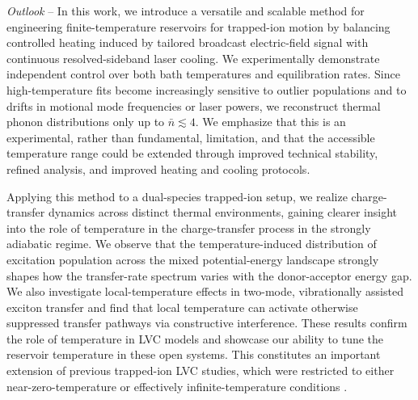 \documentclass[%
reprint,
superscriptaddress,
amsmath,amssymb,
aps,
prl,
floatfix,
]{revtex4-2}
\begin{document}

\emph{Outlook} -- In this work, we introduce a versatile and scalable method for engineering finite-temperature reservoirs for trapped-ion motion by balancing controlled heating induced by tailored broadcast electric-field signal with continuous resolved-sideband laser cooling. We experimentally demonstrate independent control over both bath temperatures and equilibration rates. Since high-temperature fits become increasingly sensitive to outlier populations and to drifts in motional mode frequencies or laser powers, we reconstruct thermal phonon distributions only up to $\bar{n}\lesssim 4$. We emphasize that this is an experimental, rather than fundamental, limitation, and that the accessible temperature range could be extended through improved technical stability, refined analysis, and improved heating and cooling protocols.

Applying this method to a dual-species trapped-ion setup, we realize charge-transfer dynamics across distinct thermal environments, gaining clearer insight into the role of temperature in the charge-transfer process in the strongly adiabatic regime. We observe that the temperature-induced distribution of excitation population across the mixed potential-energy landscape strongly shapes how the transfer-rate spectrum varies with the donor-acceptor energy gap. We also investigate local-temperature effects in two-mode, vibrationally assisted exciton transfer and find that local temperature can activate otherwise suppressed transfer pathways via constructive interference. These results confirm the role of temperature in LVC models and showcase our ability to tune the reservoir temperature in these open systems. This constitutes an important extension of previous trapped-ion LVC studies, which were restricted to either near-zero-temperature \cite{so2024electrontransfer,so2025multimode} or effectively infinite-temperature conditions \cite{sun2025quantum,navickas2025chemical}.
\end{document}
